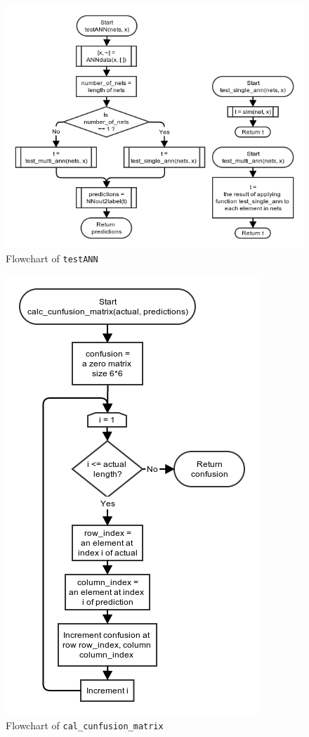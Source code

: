 \documentclass[10pt,a4paper]{article}
\begin{document}
\begin{figure}[!ht]
	\centering
	\includegraphics[scale=0.63]{images/flow_chart/testann.png}
	\caption{Flowchart of \tt{testANN}}
	\label{fig:testann}
\end{figure}

\begin{figure}[!ht]
	\centering
	\includegraphics[scale=0.63]{images/flow_chart/cal_cunfusion_matrix.png}
	\caption{Flowchart of \tt{cal\_cunfusion\_matrix}}
	\label{fig:cal_cunfusion_matrix}
\end{figure}
\end{document}
